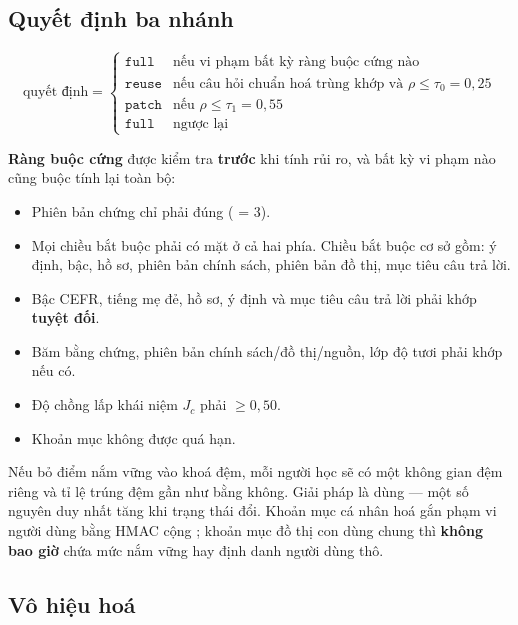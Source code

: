 \subsection{Quyết định ba nhánh}

\begin{equation}
\text{quyết định} =
\begin{cases}
\texttt{full} & \text{nếu vi phạm bất kỳ ràng buộc cứng nào}\\
\texttt{reuse} & \text{nếu câu hỏi chuẩn hoá trùng khớp và } \rho \le \tau_0 = 0{,}25\\
\texttt{patch} & \text{nếu } \rho \le \tau_1 = 0{,}55\\
\texttt{full} & \text{ngược lại}
\end{cases}
\end{equation}

\textbf{Ràng buộc cứng} được kiểm tra \textbf{trước} khi tính rủi ro, và bất kỳ vi phạm nào
cũng buộc tính lại toàn bộ:

\begin{itemize}[leftmargin=1.4em]
  \item Phiên bản chứng chỉ phải đúng ( = 3).
  \item Mọi chiều bắt buộc phải có mặt ở cả hai phía. Chiều bắt buộc cơ sở gồm: ý định,
  bậc,  hồ sơ, phiên bản chính sách, phiên bản đồ thị, mục tiêu câu trả lời.
  \item Bậc CEFR, tiếng mẹ đẻ,  hồ sơ, ý định và mục tiêu câu trả lời phải khớp
  \textbf{tuyệt đối}.
  \item Băm bằng chứng, phiên bản chính sách/đồ thị/nguồn, lớp độ tươi phải khớp nếu có.
  \item Độ chồng lấp khái niệm \(J_c\) phải \(\ge 0{,}50\).
  \item Khoản mục không được quá hạn.
\end{itemize}

\begin{luuy}
Nếu bỏ điểm nắm vững vào khoá đệm, mỗi người học sẽ có một không gian đệm riêng và tỉ lệ
trúng đệm gần như bằng không. Giải pháp là dùng  — một số nguyên duy
nhất tăng khi trạng thái đổi. Khoản mục cá nhân hoá gắn phạm vi người dùng bằng HMAC cộng
; khoản mục đồ thị con dùng chung thì \textbf{không bao giờ} chứa mức nắm vững
hay định danh người dùng thô.
\end{luuy}

\subsection{Vô hiệu hoá}


